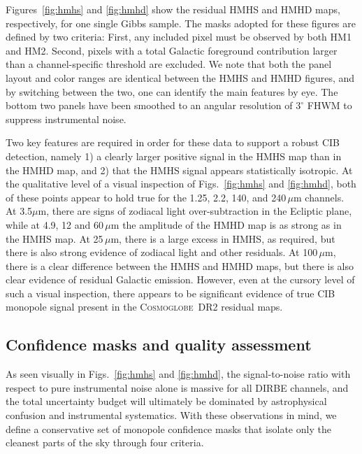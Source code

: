 \documentclass{aa}
\newcommand{\cosmoglobe}{\textsc{Cosmoglobe}}
\begin{document}
Figures~\ref{fig:hmhs} and \ref{fig:hmhd} show the residual HMHS and
HMHD maps, respectively, for one single Gibbs sample. The masks
adopted for these figures are defined by two criteria: First, any
included pixel must be observed by both HM1 and HM2. Second, pixels
with a total Galactic foreground contribution larger than a
channel-specific threshold are excluded. We note that both the panel
layout and color ranges are identical between the HMHS and HMHD
figures, and by switching between the two, one can identify
the main features by eye. The bottom two panels have been smoothed to
an angular resolution of $3^{\circ}$ FHWM to suppress instrumental noise.

Two key features are required in order for these data to support a
robust CIB detection, namely 1) a clearly larger positive signal in
the HMHS map than in the HMHD map, and 2) that the HMHS signal appears
statistically isotropic. At the qualitative level of a visual
inspection of Figs.~\ref{fig:hmhs} and \ref{fig:hmhd}, both of these
points appear to hold true for the 1.25, 2.2, 140, and
240\,$\mu\mathrm{m}$ channels. At 3.5$\mu\mathrm{m}$, there are signs
of zodiacal light over-subtraction in the Ecliptic plane, while at
4.9, 12 and 60\,$\mu\mathrm{m}$ the amplitude of the HMHD map is as
strong as in the HMHS map. At 25\,$\mu\mathrm{m}$, there is a large
excess in HMHS, as required, but there is also strong evidence of
zodiacal light and other residuals. At 100\,$\mu\mathrm{m}$, there is
a clear difference between the HMHS and HMHD maps, but there is also
clear evidence of residual Galactic emission. However, even at the
cursory level of such a visual inspection, there appears to be
significant evidence of true CIB monopole signal present in the
\cosmoglobe\ DR2 residual maps.

\subsection{Confidence masks and quality assessment}
\label{sec:masks}

As seen visually in Figs.~\ref{fig:hmhs} and \ref{fig:hmhd}, the
signal-to-noise ratio with respect to pure instrumental noise alone is
massive for all DIRBE channels, and the total uncertainty budget will
ultimately be dominated by astrophysical confusion and instrumental
systematics. With these observations in mind, we define a conservative
set of monopole confidence masks that isolate only the cleanest parts
of the sky through four criteria.
\end{document}
